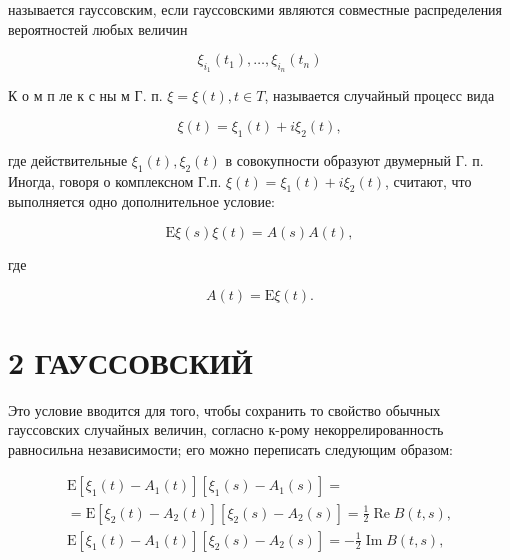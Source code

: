 \documentclass[10pt]{article}
\begin{document}
называется гауссовским, если гауссовскими являются совместные распределения вероятностей любых величин



\[

\xi_{i_{1}}\left(t_{1}\right), \ldots, \xi_{i_{n}}\left(t_{n}\right)

\]



К о м п ле к с ны м Г. п. $\xi=\xi(t), t \in T$, называется случайный процесс вида



\[

\xi(t)=\xi_{1}(t)+i \xi_{2}(t),

\]



где действительные $\xi_{1}(t), \xi_{2}(t)$ в совокупности образуют двумерный Г. п. Иногда, говоря о комплексном Г.п. $\xi(t)=\xi_{1}(t)+i \xi_{2}(t)$, считают, что выполняется одно дополнительное условие:



\[

\mathrm{E} \xi(s) \xi(t)=A(s) A(t),

\]



где



\[

A(t)=\mathrm{E} \xi(t) .

\]



\section{2 ГАУССОВСКИЙ}

Это условие вводится для того, чтобы сохранить то свойство обычных гауссовских случайных величин, согласно к-рому некоррелированность равносильна независимости; его можно переписать следующим образом:



\[

\begin{gathered}

\mathrm{E}\left[\xi_{1}(t)-A_{1}(t)\right]\left[\xi_{1}(s)-A_{1}(s)\right]= \\

=\mathrm{E}\left[\xi_{2}(t)-A_{2}(t)\right]\left[\xi_{2}(s)-A_{2}(s)\right]=\frac{1}{2} \operatorname{Re} B(t, s), \\

\mathrm{E}\left[\xi_{1}(t)-A_{1}(t)\right]\left[\xi_{2}(s)-A_{2}(s)\right]=-\frac{1}{2} \operatorname{Im} B(t, s),

\end{gathered}

\]
\end{document}
